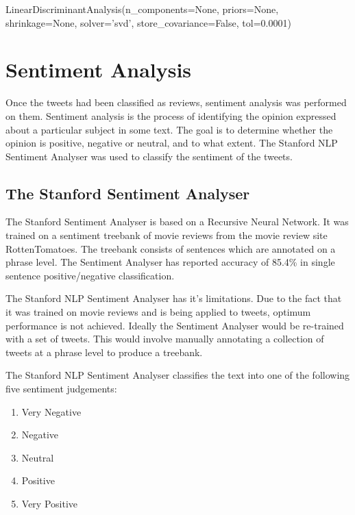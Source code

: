 \begin{tcolorbox}
\begin{center}
	LinearDiscriminantAnalysis(n\_components=None, priors=None, shrinkage=None, solver='svd', store\_covariance=False, tol=0.0001)
\end{center}
\end{tcolorbox}


\section{Sentiment Analysis}

Once the tweets had been classified as reviews, sentiment analysis was performed on them. Sentiment analysis is the process of identifying the opinion expressed about a particular subject in some text. The goal is to determine whether the opinion is positive, negative or neutral, and to what extent. The Stanford NLP Sentiment Analyser \cite{stanfordSentiment2013} was used to classify the sentiment of the tweets.

\subsection*{The Stanford Sentiment Analyser}

The Stanford Sentiment Analyser is based on a Recursive Neural Network. It was trained on a sentiment treebank of movie reviews from the movie review site RottenTomatoes. The treebank consists of sentences which are annotated on a phrase level. The Sentiment Analyser has reported accuracy of 85.4\% in single sentence positive/negative classification. 

The Stanford NLP Sentiment Analyser has it's limitations. Due to the fact that it was trained on movie reviews and is being applied to tweets, optimum performance is not achieved. Ideally the Sentiment Analyser would be re-trained with a set of tweets. This would involve manually annotating a collection of tweets at a phrase level to produce a treebank.


The Stanford NLP Sentiment Analyser classifies the text into one of the following five sentiment judgements: 
\begin{enumerate}
    \item Very Negative
    \item Negative
    \item Neutral
    \item Positive
    \item Very Positive
\end{enumerate}

